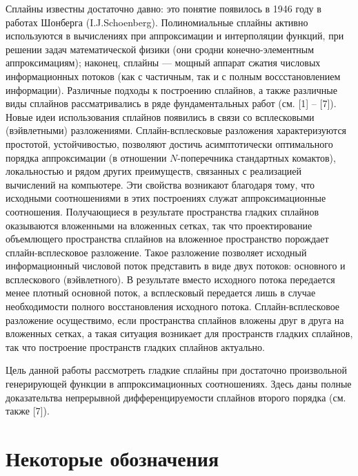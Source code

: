 \documentclass{spisok-article}
\begin{document}
    Сплайны известны достаточно давно: это понятие появилось в
    1946 году в работах Шонберга (I.J.Schoenberg). Полиномиальные
    сплайны активно используются в вычислениях при аппроксимации и
    интерполяции  функций, при решении задач математической физики
    (они сродни конечно-элементным аппроксимациям); наконец,
    сплайны --- мощный аппарат сжатия числовых информационных потоков
     (как с частичным, так и с полным воссстановлением
     информации). Различные подходы к построению сплайнов, а
     также различные виды сплайнов рассматривались в ряде
     фундаментальных работ (см. [1] -- [7]). Новые идеи
     использования сплайнов появились в
     связи со всплесковыми (вэйвлетными) разложениями.
     Сплайн-всплесковые разложения характеризуются простотой,
     устойчивостью, позволяют достичь асимптотически оптимального
     порядка аппроксимации (в отношении $N$-поперечника стандартных
     комактов), локальностью и рядом других преимуществ, связанных
     с реализацией вычислений на компьютере. Эти свойства
     возникают благодаря тому, что исходными соотношениями в этих
     построениях служат аппроксимационные соотношения.
     Получающиеся в результате пространства гладких сплайнов
     оказываются вложенными на вложенных сетках, так что
     проектирование объемлющего пространства сплайнов на вложенное
     пространство
     порождает сплайн-всплесковое разложение. Такое разложение
     позволяет исходный информационный числовой поток представить
     в виде двух потоков: основного и всплескового (вэйвлетного).
     В результате вместо исходного потока передается менее плотный
     основной поток, а всплесковый передается лишь в случае
     необходимости полного восстановления исходного потока.
     Сплайн-всплесковое разложение осуществимо, если пространства
     сплайнов вложены друг в друга на вложенных сетках,
     а такая ситуация возникает для  пространств гладких сплайнов,
     так что построение пространств гладких сплайнов актуально.

     Цель данной работы рассмотреть гладкие сплайны при достаточно
     произвольной генерирующей функции в аппроксимационных
     соотношениях. Здесь даны полные доказательтва непрерывной
     дифференцируемости сплайнов второго порядка (см. также [7]).

\section{Некоторые обозначения}
\end{document}
